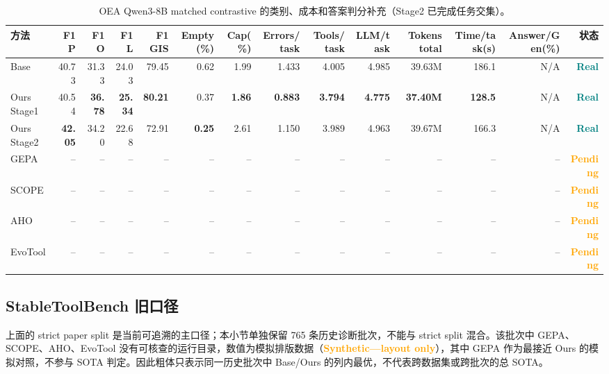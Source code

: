 \documentclass[a4paper,11pt]{article}
\newcommand{\real}{\textcolor{teal}{\textbf{Real}}}
\newcommand{\pending}{\textcolor{orange}{\textbf{Pending}}}
\newcommand{\layoutonly}{\textcolor{orange}{\textbf{Synthetic---layout only}}}
\begin{document}
\begin{CJK*}{UTF8}{gbsn}
\begin{table}[H]
\centering\scriptsize
\caption{OEA Qwen3-8B matched contrastive 的类别、成本和答案判分补充（Stage2 已完成任务交集）。}
\begin{adjustbox}{max width=\textwidth}
\begin{tabular}{lrrrrrrrrrrrrr}
\toprule
方法 & F1 P & F1 O & F1 L & F1 GIS & Empty(\%) & Cap(\%) & Errors/task & Tools/task & LLM/task & Tokens total & Time/task(s) & Answer/Gen(\%) & 状态\\
\midrule
Base & 40.73 & 31.33 & 24.03 & 79.45 & 0.62 & 1.99 & 1.433 & 4.005 & 4.985 & 39.63M & 186.1 & N/A & \real\\
Ours Stage1 & 40.54 & \textbf{36.78} & \textbf{25.34} & \textbf{80.21} & 0.37 & \textbf{1.86} & \textbf{0.883} & \textbf{3.794} & \textbf{4.775} & \textbf{37.40M} & \textbf{128.5} & N/A & \real\\
Ours Stage2 & \textbf{42.05} & 34.20 & 22.68 & 72.91 & \textbf{0.25} & 2.61 & 1.150 & 3.989 & 4.963 & 39.67M & 166.3 & N/A & \real\\
GEPA & -- & -- & -- & -- & -- & -- & -- & -- & -- & -- & -- & -- & \pending\\
SCOPE & -- & -- & -- & -- & -- & -- & -- & -- & -- & -- & -- & -- & \pending\\
AHO & -- & -- & -- & -- & -- & -- & -- & -- & -- & -- & -- & -- & \pending\\
EvoTool & -- & -- & -- & -- & -- & -- & -- & -- & -- & -- & -- & -- & \pending\\
\bottomrule
\end{tabular}
\end{adjustbox}
\end{table}

\subsection{StableToolBench 旧口径}

\begin{sloppypar}
上面的 strict paper split 是当前可追溯的主口径；本小节单独保留 765 条历史诊断批次，不能与 strict split 混合。该批次中 GEPA、SCOPE、AHO、EvoTool 没有可核查的运行目录，数值为模拟排版数据（\layoutonly），其中 GEPA 作为最接近 Ours 的模拟对照，不参与 SOTA 判定。因此粗体只表示同一历史批次中 Base/Ours 的列内最优，不代表跨数据集或跨批次的总 SOTA。
\end{sloppypar}


\end{CJK*}
\end{document}
